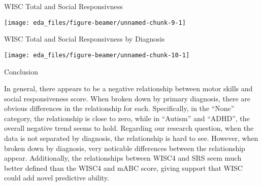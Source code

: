 \documentclass[12pt,ignorenonframetext,aspectratio=169]{beamer}
\begin{document}
\begin{frame}{WISC Total and Social Responsivness}
\protect\hypertarget{wisc-total-and-social-responsivness}{}

\begin{center}\texttt{[image: eda\_files/figure-beamer/unnamed-chunk-9-1]} \end{center}

\end{frame}

\begin{frame}{WISC Total and Social Responsivness by Diagnosis}
\protect\hypertarget{wisc-total-and-social-responsivness-by-diagnosis}{}

\begin{center}\texttt{[image: eda\_files/figure-beamer/unnamed-chunk-10-1]} \end{center}

\end{frame}

\begin{frame}{Conclusion}
\protect\hypertarget{conclusion}{}

In general, there appears to be a negative relationship between motor
skills and social responsiveness score. When broken down by primary
diagnosis, there are obvious differences in the relationship for each.
Specifically, in the ``None'' category, the relationship is close to
zero, while in ``Autism'' and ``ADHD'', the overall negative trend seems
to hold. Regarding our research question, when the data is not separated
by diagnosis, the relationship is hard to see. However, when broken down
by diagnosis, very noticable differences between the relationship
appear. Additionally, the relationships between WISC4 and SRS seem much
better defined than the WISC4 and mABC score, giving support that WISC
could add novel predictive ability.

\end{frame}
\end{document}

